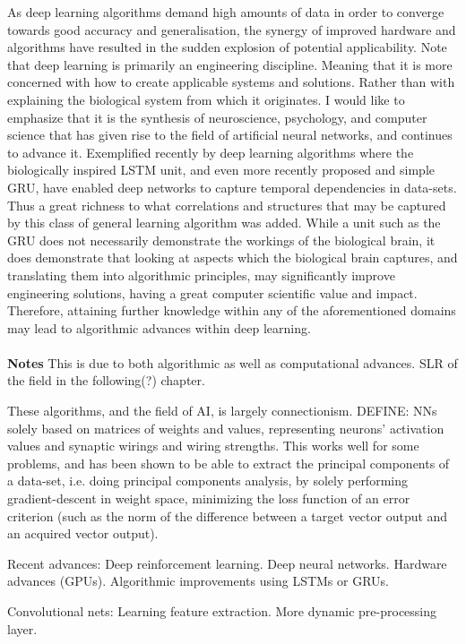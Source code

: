 As deep learning algorithms demand high amounts of data in order to converge towards good accuracy and generalisation, the synergy of improved hardware and algorithms have resulted in the sudden explosion of potential applicability. Note that deep learning is primarily an engineering discipline. Meaning that it is more concerned with how to create applicable systems and solutions. Rather than with explaining the biological system from which it originates. I would like to emphasize that it is the synthesis of neuroscience, psychology, and computer science that has given rise to the field of artificial neural networks, and continues to advance it. Exemplified recently by deep learning algorithms where the biologically inspired LSTM unit, and even more recently proposed and simple GRU, have enabled deep networks to capture temporal dependencies in data-sets. Thus a great richness to what correlations and structures that may be captured by this class of general learning algorithm was added. While a unit such as the GRU does not necessarily demonstrate the workings of the biological brain, it does demonstrate that looking at aspects which the biological brain captures, and translating them into algorithmic principles, may significantly improve engineering solutions, having a great computer scientific value and impact. Therefore, attaining further knowledge within any of the aforementioned domains may lead to algorithmic advances within deep learning. 
\\\\


\textbf{Notes}
This is due to both algorithmic as well as computational advances. SLR of the field in the following(?) chapter.

These algorithms, and the field of AI, is largely connectionism. DEFINE: NNs solely based on matrices of weights and values, representing neurons' activation values and synaptic wirings and wiring strengths. This works well for some problems, and has been shown to be able to extract the principal components of a data-set, i.e. doing principal components analysis, by solely performing gradient-descent in weight space, minimizing the loss function of an error criterion (such as the norm of the difference between a target vector output and an acquired vector output).

Recent advances: Deep reinforcement learning. Deep neural networks. Hardware advances (GPUs). Algorithmic improvements using LSTMs or GRUs.

Convolutional nets: Learning feature extraction. More dynamic pre-processing layer.

